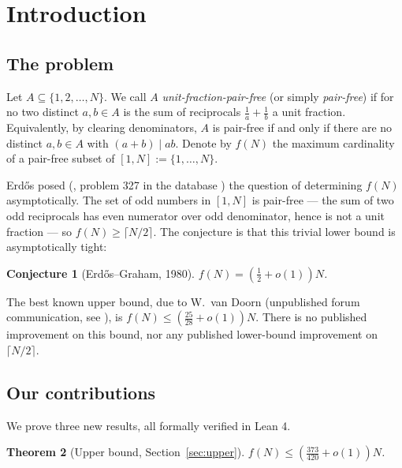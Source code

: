 \documentclass[11pt]{amsart}
\theoremstyle{plain}
\newtheorem{theorem}{Theorem}[section]
\newtheorem{conjecture}[theorem]{Conjecture}
\theoremstyle{definition}
\begin{document}
\tableofcontents

\section{Introduction}

\subsection{The problem}

Let $A \subseteq \{1, 2, \ldots, N\}$. We call $A$ \emph{unit-fraction-pair-free} (or simply \emph{pair-free}) if for no two distinct $a, b \in A$ is the sum of reciprocals $\tfrac{1}{a} + \tfrac{1}{b}$ a unit fraction. Equivalently, by clearing denominators, $A$ is pair-free if and only if there are no distinct $a, b \in A$ with $(a + b) \mid ab$. Denote by $f(N)$ the maximum cardinality of a pair-free subset of $[1, N] := \{1, \ldots, N\}$.

Erd\H{o}s posed (\cite{ErdosGraham1980}, problem 327 in the database \cite{ErdosProblems}) the question of determining $f(N)$ asymptotically. The set of odd numbers in $[1, N]$ is pair-free --- the sum of two odd reciprocals has even numerator over odd denominator, hence is not a unit fraction --- so $f(N) \geq \lceil N/2 \rceil$. The conjecture is that this trivial lower bound is asymptotically tight:

\begin{conjecture}[Erd\H{o}s--Graham, 1980]\label{conj:half}
$f(N) = \left(\tfrac{1}{2} + o(1)\right) N$.
\end{conjecture}

The best known upper bound, due to W.\ van Doorn (unpublished forum communication, see \cite{ErdosProblems}), is $f(N) \leq \left(\tfrac{25}{28} + o(1)\right) N$. There is no published improvement on this bound, nor any published lower-bound improvement on $\lceil N/2 \rceil$.

\subsection{Our contributions}

We prove three new results, all formally verified in Lean 4.

\begin{theorem}[Upper bound, Section~\ref{sec:upper}]\label{thm:373over420}
$f(N) \leq \left(\tfrac{373}{420} + o(1)\right) N$.
\end{theorem}
\end{document}

